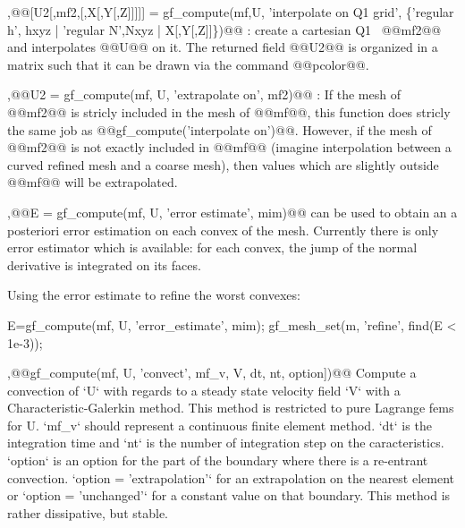 \begin{cmddescription}
  \sep{@@[U2[,mf2,[,X[,Y[,Z]]]]] = gf\_compute(mf,U, 'interpolate on Q1 grid', 
                               \{'regular h', hxyz | 'regular N',Nxyz |
                               X[,Y[,Z]]\})@@} :
  create a cartesian Q1 \tmf\ @@mf2@@ and interpolates @@U@@ on it. The
  returned field @@U2@@ is organized in a matrix such that it can be drawn
  via the \mlab command @@pcolor@@.
  
  \sep{@@U2 = gf\_compute(mf, U, 'extrapolate on', mf2)@@} : 
  If the mesh of @@mf2@@ is stricly included in the mesh of @@mf@@, this
  function does stricly the same job as
  @@gf\_compute('interpolate on')@@. However, if the mesh of @@mf2@@ is not
  exactly included in @@mf@@ (imagine interpolation between a curved
  refined mesh and a coarse mesh), then values which are slightly
  outside @@mf@@ will be extrapolated.

  \sep{@@E = gf\_compute(mf, U, 'error estimate', mim)@@} can be used to
  obtain an a posteriori error estimation on each convex of the mesh.
  Currently there is only error estimator which is available: for each
  convex, the jump of the normal derivative is integrated on its
  faces.
\end{cmddescription}
\begin{cmdexamples}
  Using the error estimate to refine the worst convexes:
  \begin{mcode}
    E=gf_compute(mf, U, 'error_estimate', mim);
    gf_mesh_set(m, 'refine', find(E < 1e-3));
  \end{mcode}
\end{cmdexamples}

  \sep{@@gf\_compute(mf, U, 'convect', \tmf mf_v, \tvec V, \tscal dt, \tint nt, \tstr option])@@} Compute a convection of `U` with regards to a steady state velocity
  field `V` with a Characteristic-Galerkin method. This
  method is restricted to pure Lagrange fems for U. `mf_v` should represent
  a continuous finite element method. `dt` is the integration time and `nt`
  is the number of integration
  step on the caracteristics.  `option` is an
  option for the part of the boundary where there is a re-entrant convection.
  `option = 'extrapolation'` for an extrapolation on the nearest element
  or `option = 'unchanged'` for a constant value on that boundary.
  This method is rather dissipative, but stable.

\newpage


